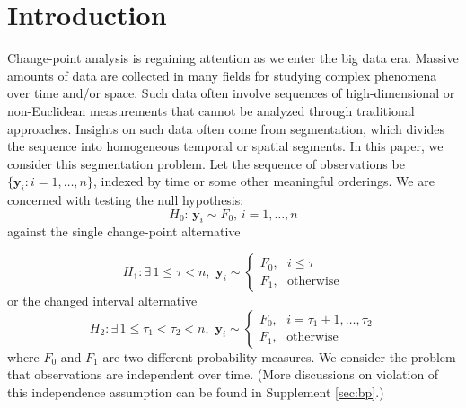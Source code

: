 \documentclass[arxiv, preprint]{imsart}
\numberwithin{equation}{section}
\theoremstyle{plain}
\begin{document}
\begin{frontmatter}
\begin{keyword}[class=MSC]
\end{keyword}

\begin{keyword}
\end{keyword}

\end{frontmatter}

\section{Introduction}
Change-point analysis is regaining attention as we enter the big data era. Massive amounts of data are collected in many fields for studying complex phenomena over time and/or space. Such data often involve sequences of high-dimensional or non-Euclidean measurements that cannot be analyzed through traditional approaches. Insights on such data often come from segmentation, which divides the sequence into homogeneous temporal or spatial segments. In this paper, we consider this segmentation problem. Let the sequence of observations be $\{ \mathbf{y}_i: i = 1, \hdots, n \}$, indexed by time or some other meaningful orderings. We are concerned with testing the null hypothesis: 
\begin{equation} \label{eq:H0}
 H_0: \, \mathbf{y}_i \sim F_0, \, i = 1, \hdots, n \end{equation} against the single change-point alternative

\begin{equation} \label{eq:H1} 
H_1: \exists \, 1 \le \tau < n, \, \, \mathbf{y}_i \sim 
\begin{cases}
F_0,  \,\,\,\,  i \le \tau \\
F_1,  \,\,\,\, \text{otherwise}
\end{cases}
\end{equation}
or the changed interval alternative 
\begin{equation} \label{eq:H2}
H_2: \exists \, 1 \le \tau_1 < \tau_2 < n, \, \, \mathbf{y}_i \sim 
\begin{cases}
F_0, \,\,\,\, i = \tau_1 + 1, \hdots, \tau_2 \\
F_1, \,\,\,\, \text{otherwise}
\end{cases} \end{equation}
where $F_0$ and $F_1$ are two different probability measures. We consider the problem that observations are independent over time.  (More discussions on violation of this independence assumption can be found in Supplement \ref{sec:bp}.)
 
\end{document}
